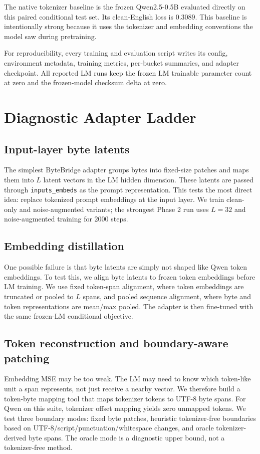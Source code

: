 \documentclass{article}
\newcommand{\bb}{ByteBridge}
\newcommand{\qwen}{Qwen2.5-0.5B}
\begin{document}
The native tokenizer baseline is the frozen \qwen{} evaluated directly on this paired conditional test set. Its clean-English loss is $0.3089$. This baseline is intentionally strong because it uses the tokenizer and embedding conventions the model saw during pretraining.

For reproducibility, every training and evaluation script writes its config, environment metadata, training metrics, per-bucket summaries, and adapter checkpoint. All reported LM runs keep the frozen LM trainable parameter count at zero and the frozen-model checksum delta at zero.

\section{Diagnostic Adapter Ladder}

\subsection{Input-layer byte latents}

The simplest \bb{} adapter groups bytes into fixed-size patches and maps them into $L$ latent vectors in the LM hidden dimension. These latents are passed through \texttt{inputs\_embeds} as the prompt representation. This tests the most direct idea: replace tokenized prompt embeddings at the input layer. We train clean-only and noise-augmented variants; the strongest Phase 2 run uses $L=32$ and noise-augmented training for 2000 steps.

\subsection{Embedding distillation}

One possible failure is that byte latents are simply not shaped like Qwen token embeddings. To test this, we align byte latents to frozen token embeddings before LM training. We use fixed token-span alignment, where token embeddings are truncated or pooled to $L$ spans, and pooled sequence alignment, where byte and token representations are mean/max pooled. The adapter is then fine-tuned with the same frozen-LM conditional objective.

\subsection{Token reconstruction and boundary-aware patching}

Embedding MSE may be too weak. The LM may need to know which token-like unit a span represents, not just receive a nearby vector. We therefore build a token-byte mapping tool that maps tokenizer tokens to UTF-8 byte spans. For Qwen on this suite, tokenizer offset mapping yields zero unmapped tokens. We test three boundary modes: fixed byte patches, heuristic tokenizer-free boundaries based on UTF-8/script/punctuation/whitespace changes, and oracle tokenizer-derived byte spans. The oracle mode is a diagnostic upper bound, not a tokenizer-free method.
\end{document}
